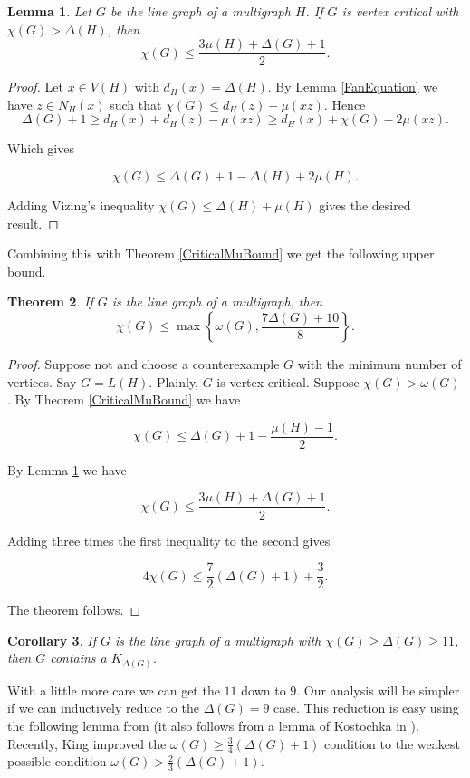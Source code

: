 \documentclass[12pt]{article}
\theoremstyle{plain}
\newtheorem{thm}{Theorem}
\newtheorem{lem}[thm]{Lemma}
\newtheorem{cor}[thm]{Corollary}
\theoremstyle{definition}
\theoremstyle{remark}
\begin{document}
\begin{lem}\label{Goldberg}
Let $G$ be the line graph of a multigraph $H$.  If $G$ is vertex critical with $\chi(G) > \Delta(H)$, then
\[\chi(G) \leq \frac{3\mu(H) + \Delta(G) + 1}{2}.\]
\end{lem}
\begin{proof}
Let $x \in V(H)$ with $d_H(x) = \Delta(H)$.  By Lemma \ref{FanEquation} we have $z \in N_H(x)$ such that $\chi(G) \leq d_H(z) + \mu(xz)$.  Hence
\[\Delta(G) + 1 \geq d_H(x) + d_H(z) - \mu(xz) \geq d_H(x) + \chi(G) - 2\mu(xz).\]

\noindent Which gives

\[\chi(G) \leq \Delta(G) + 1 - \Delta(H) + 2\mu(H).\]

\noindent Adding Vizing's inequality $\chi(G) \leq \Delta(H) + \mu(H)$ gives the desired result.
\end{proof}

\noindent Combining this with Theorem \ref{CriticalMuBound} we get the following upper bound.

\begin{thm}\label{TheoremL}
If $G$ is the line graph of a multigraph, then
\[\chi(G) \leq \max\left\{\omega(G), \frac{7\Delta(G) + 10}{8}\right\}.\]
\end{thm}
\begin{proof}
Suppose not and choose a counterexample $G$ with the minimum number of vertices.  Say $G = L(H)$. Plainly, $G$ is vertex critical.  Suppose $\chi(G) > \omega(G)$. By Theorem \ref{CriticalMuBound} we have

\[\chi(G) \leq \Delta(G) + 1 - \frac{\mu(H) - 1}{2}.\]

\noindent By Lemma \ref{Goldberg} we have

\[\chi(G) \leq \frac{3\mu(H) + \Delta(G) + 1}{2}.\]

\noindent Adding three times the first inequality to the second gives

\[4\chi(G) \leq \frac72(\Delta(G) + 1) + \frac32.\]

\noindent The theorem follows.
\end{proof}

\begin{cor}
If $G$ is the line graph of a multigraph with $\chi(G) \geq \Delta(G) \geq 11$, then $G$ contains a $K_{\Delta(G)}$.
\end{cor}

With a little more care we can get the $11$ down to $9$.  Our analysis will be simpler if we can inductively reduce to the $\Delta(G) = 9$ case.  This reduction is easy using the following lemma from \cite{rabernhitting} (it also follows from a lemma of Kostochka in \cite{kostochkaRussian}).  Recently, King \cite{king2010hitting} improved the $\omega(G) \geq \frac{3}{4}(\Delta(G) + 1)$ condition to the weakest possible condition $\omega(G) > \frac23(\Delta(G) + 1)$.
\end{document}
